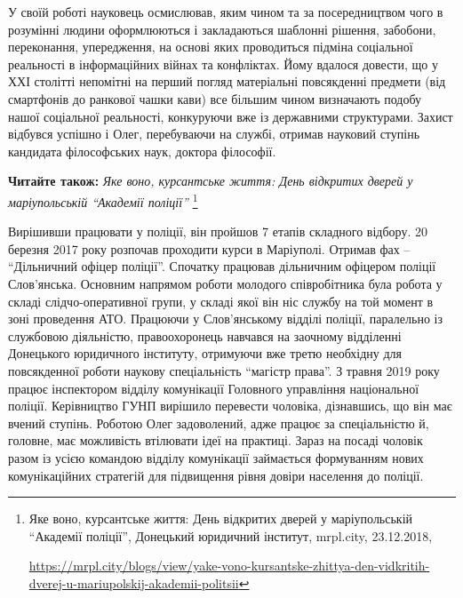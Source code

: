 
У своїй роботі науковець осмислював, яким чином та за посередництвом чого в
розумінні людини оформлюються і закладаються шаблонні рішення, забобони,
переконання, упередження, на основі яких проводиться підміна соціальної
реальності в інформаційних війнах та конфліктах. Йому вдалося довести, що у ХХІ
столітті непомітні на перший погляд матеріальні повсякденні предмети (від
смартфонів до ранкової чашки кави) все більшим чином визначають подобу нашої
соціальної реальності, конкуруючи вже із державними структурами. Захист
відбувся успішно і Олег, перебуваючи на службі, отримав науковий ступінь
кандидата філософських наук, доктора філософії.

\textbf{Читайте також:} \emph{Яке воно, курсантське життя: День відкритих дверей у маріупольській \enquote{Академії поліції}}%
\footnote{Яке воно, курсантське життя: День відкритих дверей у маріупольській \enquote{Академії поліції}, Донецький юридичний інститут, %
mrpl.city, 23.12.2018, \par%
\url{https://mrpl.city/blogs/view/yake-vono-kursantske-zhittya-den-vidkritih-dverej-u-mariupolskij-akademii-politsii}
}

Вирішивши працювати у поліції, він пройшов 7 етапів складного відбору. 20
березня 2017 року розпочав проходити курси в Маріуполі. Отримав фах –
\enquote{Дільничний офіцер поліції}. Спочатку працював дільничним офіцером поліції
Слов'янська. Основним напрямом роботи молодого співробітника була робота у
складі слідчо-оперативної групи, у складі якої він ніс службу на той момент в
зоні проведення АТО. Працюючи у Слов'янському відділі поліції, паралельно із
службовою діяльністю, правоохоронець навчався на заочному відділенні Донецького
юридичного інституту, отримуючи вже третю необхідну для повсякденної роботи
наукову спеціальність \enquote{магістр права}. З травня 2019 року працює інспектором
відділу комунікації Головного управління національної поліції. Керівництво ГУНП
вирішило перевести чоловіка, дізнавшись, що він має вчений ступінь. Роботою
Олег задоволений, адже працює за спеціальністю й, головне, має можливість
втілювати ідеї на практиці. Зараз на посаді чоловік разом із усією командою
відділу комунікації займається формуванням нових комунікаційних стратегій для
підвищення рівня довіри населення до поліції. 


